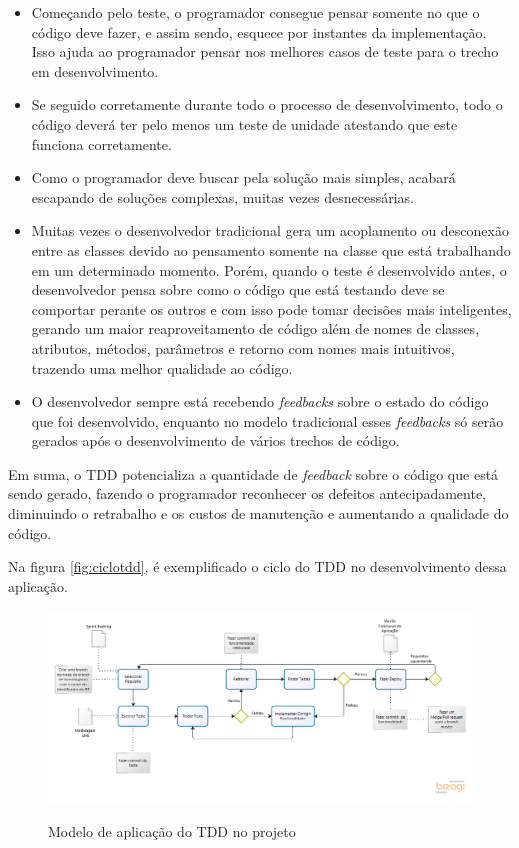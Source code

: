 \begin{itemize}
    \item Começando pelo teste, o programador consegue pensar somente no que o código deve fazer, e assim sendo, esquece por instantes da implementação. Isso ajuda ao programador pensar nos melhores casos de teste para o trecho em desenvolvimento.
    \item Se seguido corretamente durante todo o processo de desenvolvimento, todo o código deverá ter pelo menos um teste de unidade atestando que este funciona corretamente.
    \item Como o programador deve buscar pela solução mais simples, acabará escapando de soluções complexas, muitas vezes desnecessárias.
    \item Muitas vezes o desenvolvedor tradicional gera um acoplamento ou desconexão entre as classes devido ao pensamento somente na classe que está trabalhando em um determinado momento. Porém, quando o teste é desenvolvido antes, o desenvolvedor pensa sobre como o código que está testando deve se comportar perante os outros e com isso pode tomar decisões mais inteligentes, gerando um maior reaproveitamento de código além de nomes de classes, atributos, métodos, parâmetros e retorno com nomes mais intuitivos, trazendo uma melhor qualidade ao código. 
    \item O desenvolvedor sempre está recebendo \textit{feedbacks} sobre o estado do código que foi desenvolvido, enquanto no modelo tradicional esses \textit{feedbacks} só serão gerados após o desenvolvimento de vários trechos de código.
\end{itemize}

Em suma, o TDD potencializa a quantidade de \textit{feedback} sobre o código que está sendo gerado, fazendo o programador reconhecer os defeitos antecipadamente, diminuindo o retrabalho e os custos de manutenção e aumentando a qualidade do código. 

Na figura \autoref{fig:ciclotdd}, é exemplificado o ciclo do TDD no desenvolvimento dessa aplicação.

\begin{figure}[H]
    \centering
    \caption{Modelo de aplicação do TDD no projeto}
    \includegraphics[width=13cm]{dados/figuras/ModeloDeAplicacaoTDD.png}
    \label{fig:ciclotdd}
\end{figure}


